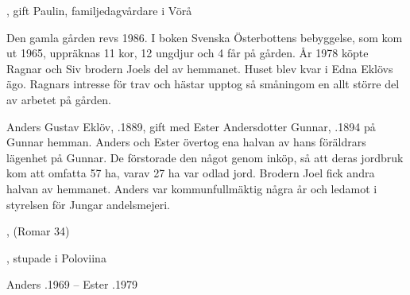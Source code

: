 \begin{jhchildren}
  \item {}
  \item {}
  \item {}, gift Paulin, familjedagvårdare i Vörå
\end{jhchildren}

Den gamla gården revs 1986. I boken Svenska Österbottens bebyggelse, som  kom ut 1965, uppräknas 11 kor, 12 ungdjur och 4 får på gården. År 1978 köpte Ragnar och Siv brodern Joels del av hemmanet. Huset blev kvar i Edna Eklövs ägo. Ragnars intresse för trav och hästar upptog så småningom en allt större del av arbetet på gården.


Anders Gustav Eklöv, .1889, gift med Ester Andersdotter Gunnar, .1894 på Gunnar hemman. Anders och Ester övertog ena halvan av hans föräldrars lägenhet på Gunnar. De förstorade den något genom inköp, så att deras jordbruk kom att omfatta 57 ha, varav 27 ha var odlad jord. Brodern Joel fick andra halvan av hemmanet. Anders var kommunfullmäktig några år och ledamot i styrelsen för Jungar andelsmejeri.

\begin{jhchildren}
  \item {}
  \item {}, (Romar 34)
  \item {}
  \item {}
  \item {}, stupade i Poloviina
  \item {}
  \item {}
  \item {}
  \item {}
  \item {}
  \item {}
  \item {}
\end{jhchildren}

Anders .1969  --  Ester .1979


